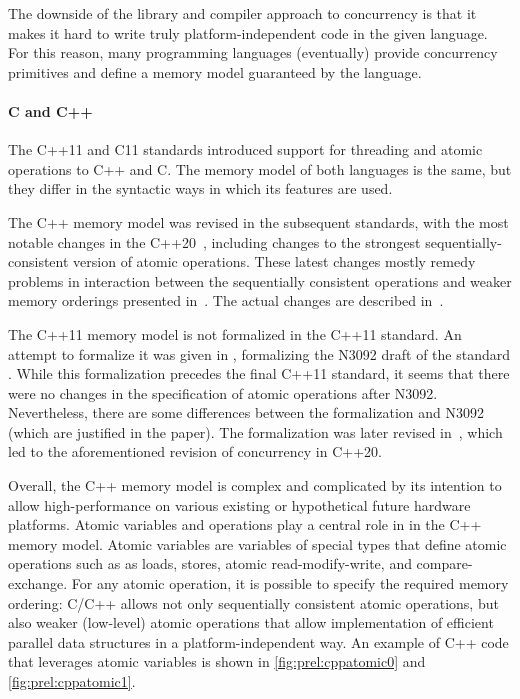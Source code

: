 The downside of the library and compiler approach to concurrency is that it
makes it hard to write truly platform-independent code in the given language.
For this reason, many programming languages (eventually) provide concurrency
primitives and define a memory model guaranteed by the language.

\paragraph{C and C++}
%
The C++11  and C11  standards
introduced support for threading and atomic operations to C++ and C.
The memory model of both languages is the same, but they differ in the
syntactic ways in which its features are used.

The C++ memory model was revised in the subsequent standards, with the most
notable changes in the C++20~, including changes to the strongest sequentially-consistent version of atomic operations.
These latest changes mostly remedy problems in interaction between the
sequentially consistent operations and weaker memory orderings presented
in~.
The actual changes are described in~.

The C++11 memory model is not formalized in the C++11 standard.
An attempt to formalize it was given in , formalizing the
N3092 draft of the standard \cite{N3092}.
While this formalization precedes the final C++11 standard, it seems that there were no changes in the specification of atomic operations after N3092.
Nevertheless, there are some differences between the formalization and N3092
(which are justified in the paper).
The formalization was later revised in~, which led to the aforementioned revision of concurrency in C++20.

Overall, the C++ memory model is complex and complicated by its intention to
allow high-performance on various existing or hypothetical future hardware
platforms.
Atomic variables and operations play a central role in in the C++ memory model.
Atomic variables are variables of special types that define atomic operations
such as as loads, stores, atomic read-modify-write, and compare-exchange.
For any atomic operation, it is possible to specify the required memory
ordering: C/C++ allows not only sequentially consistent atomic operations, but
also weaker (low-level) atomic operations that allow implementation of
efficient parallel data structures in a platform-independent way.
An example of C++ code that leverages atomic variables is shown in \autoref{fig:prel:cppatomic0} and \autoref{fig:prel:cppatomic1}.

